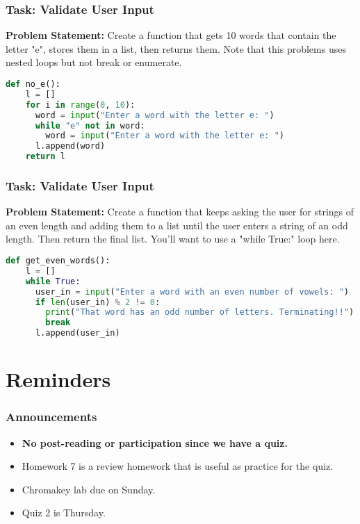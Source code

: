 \documentclass{beamer}
\begin{document}
%
%
\begin{frame}[fragile]
  \frametitle{Task: Validate User Input}
  \textbf{Problem Statement:} Create a function that gets 10 words that contain the letter "e", stores them in a list, then returns them. Note that this problems uses nested loops but not break or enumerate.
  \vfill
  \pause
  \begin{lstlisting}[language=Python, autogobble, basicstyle=\tiny]
  def no_e():
    l = []
    for i in range(0, 10):
      word = input("Enter a word with the letter e: ")
      while "e" not in word:
        word = input("Enter a word with the letter e: ")
      l.append(word)
    return l
  \end{lstlisting}
\end{frame}

%
%
\begin{frame}[fragile]
  \frametitle{Task: Validate User Input}
  \textbf{Problem Statement:} Create a function that keeps asking the user for strings of an even length and adding them to a list until the user enters a string of an odd length. Then return the final list. You'll want to use a "while True:" loop here.
  \vfill
  \pause
  \begin{lstlisting}[language=Python, autogobble, basicstyle=\tiny]
  def get_even_words():
    l = []
    while True:
      user_in = input("Enter a word with an even number of vowels: ")
      if len(user_in) % 2 != 0:
        print("That word has an odd number of letters. Terminating!!")
        break
      l.append(user_in)
  \end{lstlisting}
\end{frame}

%
%
\section{Reminders}
\begin{frame}
  \frametitle{Announcements}
  \begin{itemize}
    \item \textbf{No post-reading or participation since we have a quiz.}
    \item Homework 7 is a review homework that is useful as practice for the quiz.
    \item Chromakey lab due on Sunday.
    \item Quiz 2 is Thursday.
  \end{itemize}
\end{frame}
\end{document}
